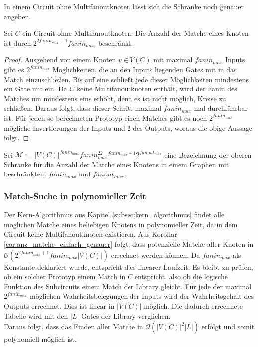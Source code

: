 \documentclass[11pt, a4paper, german]{article}
\begin{document}
In einem Circuit ohne Multifanoutknoten lässt sich die Schranke noch genauer angeben. 
\begin{cor}\label{cor:anz_matche_einfach_genauer}
Sei $C$ ein Circuit ohne Multifanoutknoten. Die Anzahl der Matche eines Knoten ist durch $2^{2fanin_{max} +1}fanin_{max}$ beschränkt.
\end{cor}
\begin{proof}
Ausgehend von einem Knoten $v \in V(C)$ mit maximal $fanin_{max}$ Inputs gibt es  $2^{fanin_{max}}$ Möglichkeiten, die an den Inputs liegenden Gates mit in das Match einzuschließen. Bis auf eine schließt jede dieser Möglichkeiten mindestens ein Gate mit ein. Da $C$ keine Multifanoutknoten enthält, wird der Fanin des Matches um mindestens eins erhöht, denn es ist nicht möglich, Kreise zu schließen. Daraus folgt, dass dieser Schritt maximal $fanin_{max}$ mal durchführbar ist. Für jeden so berechneten Prototyp einen Matches gibt es noch $2^{fanin_{max}}$ mögliche Invertierungen der Inputs und $2$ des Outputs, woraus die obige Aussage folgt.
\end{proof}
\begin{definition}
Sei $\mathcal{M}:= |V(C)|^{fanin_{max}} fanin_{max}^22^{fanin_{max}+1}2^{fanout_{max}}$ eine Bezeichnung der oberen Schranke für die Anzahl der Matche eines Knotens in einem Graphen mit beschränktem $fanin_{max}$ und $fanout_{max}$.
\end{definition}

\subsubsection{Match-Suche in polynomieller Zeit}
\label{subsubsec:pol_match_suche}
Der Kern-Algorithmus aus Kapitel \ref{subsec:kern_algorithmus} findet alle möglichen Matche eines beliebigen Knotens in polynomieller Zeit, da in dem Circuit keine Multifanoutknoten existieren. Aus Korollar \ref{cor:anz_matche_einfach_genauer} folgt, dass potenzielle Matche aller Knoten  in $\mathcal{O}(2^{2fanin_{max} +1}fanin_{max} |V(C)|)$ errechnet werden können. Da $fanin_{max}$ als Konstante deklariert wurde, entspricht dies linearer Laufzeit. Es bleibt zu prüfen, ob  ein solcher Prototyp einem Match in $C$ entspricht, also ob die logische Funktion des Subcircuits einem Match der Library gleicht. Für jede der maximal $2^{fanin_{max}}$ möglichen Wahrheitsbelegungen der Inputs wird der Wahrheitsgehalt des Outputs errechnet. Dies ist linear in $|V(C)|$ möglich. Die dadurch errechnete Tabelle wird mit den $|L|$ Gates der Library verglichen. \\
Daraus folgt, dass das Finden aller Matche in $\mathcal{O}(|V(C)|^2|L|)$ erfolgt und somit polynomiell möglich ist.
\end{document}
